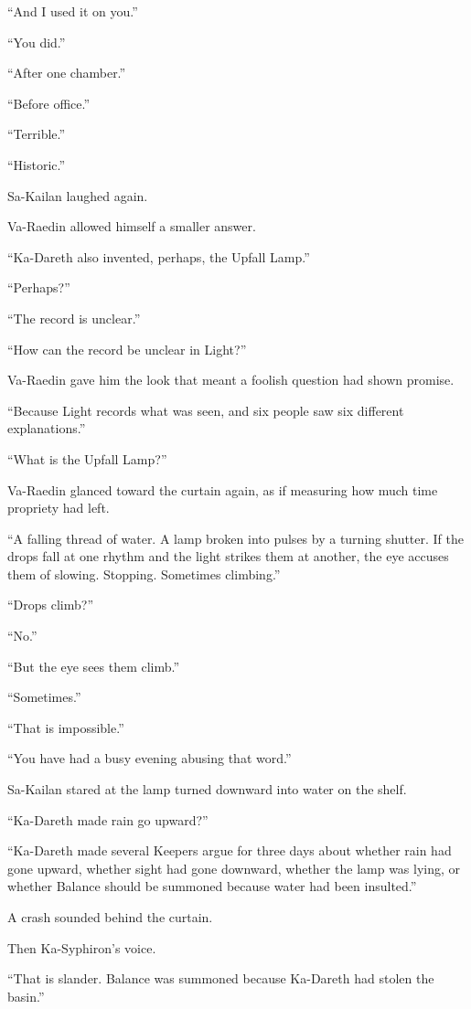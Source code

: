 “And I used it on you.”\par
“You did.”\par
“After one chamber.”\par
“Before office.”\par
“Terrible.”\par
“Historic.”\par
Sa-Kailan laughed again.\par
Va-Raedin allowed himself a smaller answer.\par
“Ka-Dareth also invented, perhaps, the Upfall Lamp.”\par
“Perhaps?”\par
“The record is unclear.”\par
“How can the record be unclear in Light?”\par
Va-Raedin gave him the look that meant a foolish question had shown promise.\par
“Because Light records what was seen, and six people saw six different explanations.”\par
“What is the Upfall Lamp?”\par
Va-Raedin glanced toward the curtain again, as if measuring how much time propriety had left.\par
“A falling thread of water. A lamp broken into pulses by a turning shutter. If the drops fall at one rhythm and the light strikes them at another, the eye accuses them of slowing. Stopping. Sometimes climbing.”\par
“Drops climb?”\par
“No.”\par
“But the eye sees them climb.”\par
“Sometimes.”\par
“That is impossible.”\par
“You have had a busy evening abusing that word.”\par
Sa-Kailan stared at the lamp turned downward into water on the shelf.\par
“Ka-Dareth made rain go upward?”\par
“Ka-Dareth made several Keepers argue for three days about whether rain had gone upward, whether sight had gone downward, whether the lamp was lying, or whether Balance should be summoned because water had been insulted.”\par
A crash sounded behind the curtain.\par
Then Ka-Syphiron’s voice.\par
“That is slander. Balance was summoned because Ka-Dareth had stolen the basin.”\par
